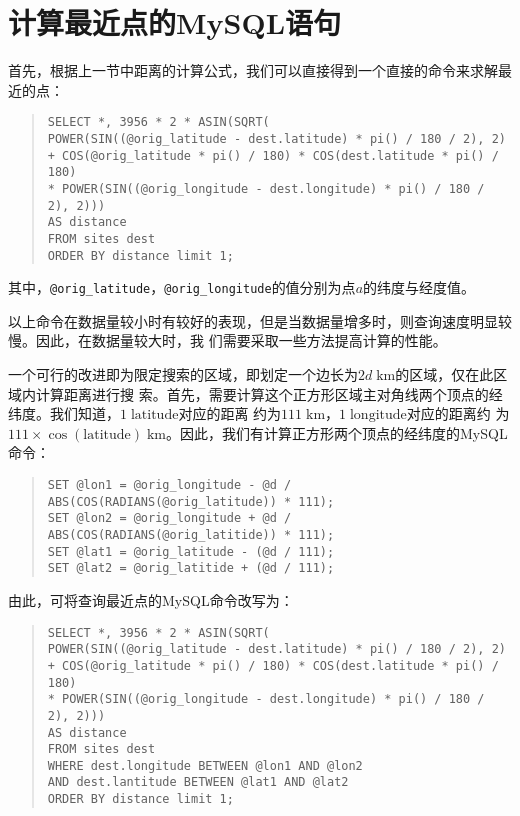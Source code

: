 \section{计算最近点的MySQL语句}
首先，根据上一节中距离的计算公式，我们可以直接得到一个直接的命令来求解最近的点：

\begin{quote}
  \texttt{SELECT *, 3956 * 2 * ASIN(SQRT(\\
    POWER(SIN((@orig\_latitude - dest.latitude) * pi() / 180 / 2), 2)\\
    + COS(@orig\_latitude * pi() / 180) * COS(dest.latitude * pi() / 180)\\
    * POWER(SIN((@orig\_longitude - dest.longitude) * pi() / 180 / 2), 2)))\\
    AS distance\\
    FROM sites dest\\
    ORDER BY distance limit 1;}
\end{quote}
其中，\texttt{@orig\_latitude}，\texttt{@orig\_longitude}的值分别为点$a$的纬度与经度值。

以上命令在数据量较小时有较好的表现，但是当数据量增多时，则查询速度明显较慢。因此，在数据量较大时，我
们需要采取一些方法提高计算的性能。

一个可行的改进即为限定搜索的区域，即划定一个边长为$2d\;\mathrm{km}$的区域，仅在此区域内计算距离进行搜
索。首先，需要计算这个正方形区域主对角线两个顶点的经纬度。我们知道，$1\;\mathrm{latitude}$对应的距离
约为$111\;\mathrm{km}$，$1\;\mathrm{longitude}$对应的距离约
为$111\times\cos(\mathrm{latitude})\;\mathrm{km}$。因此，我们有计算正方形两个顶点的经纬度的MySQL命令：
\begin{quote}
  \texttt{SET @lon1 = @orig\_longitude - @d / ABS(COS(RADIANS(@orig\_latitude)) * 111);\\
  SET @lon2 = @orig\_longitude + @d / ABS(COS(RADIANS(@orig\_latitide)) * 111);\\
  SET @lat1 = @orig\_latitude - (@d / 111);\\
  SET @lat2 = @orig\_latitide + (@d / 111);}
\end{quote}

由此，可将查询最近点的MySQL命令改写为：

\begin{quote}
  \texttt{SELECT *, 3956 * 2 * ASIN(SQRT(\\
    POWER(SIN((@orig\_latitude - dest.latitude) * pi() / 180 / 2), 2)\\
    + COS(@orig\_latitude * pi() / 180) * COS(dest.latitude * pi() / 180)\\
    * POWER(SIN((@orig\_longitude - dest.longitude) * pi() / 180 / 2), 2)))\\
    AS distance\\
    FROM sites dest\\
    WHERE dest.longitude BETWEEN @lon1 AND @lon2\\
    AND dest.lantitude BETWEEN @lat1 AND @lat2\\
    ORDER BY distance limit 1;}
\end{quote}


